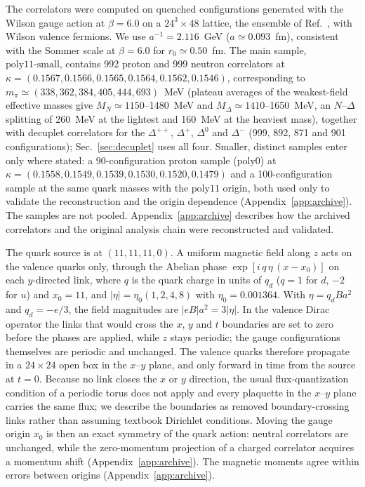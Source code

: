 \documentclass[aps,prd,reprint,twocolumn,superscriptaddress,nofootinbib,longbibliography]{revtex4-2}
\begin{document}
The correlators were computed on quenched configurations generated with the Wilson gauge action at $\beta=6.0$ on a $24^3\times48$ lattice, the ensemble of Ref.~\cite{AlexandruLee2010}, with Wilson valence fermions. We use $a^{-1}=2.116$~GeV ($a\simeq0.093$~fm), consistent with the Sommer scale at $\beta=6.0$ \cite{NeccoSommer2002} for $r_0\simeq0.50$~fm. The main sample, $\mathrm{poly11\mbox{-}small}$, contains 992 proton and 999 neutron correlators at $\kappa=(0.1567,\allowbreak 0.1566,\allowbreak 0.1565,\allowbreak 0.1564,\allowbreak 0.1562,\allowbreak 0.1546)$, corresponding to $m_\pi\simeq(338,\allowbreak 362,\allowbreak 384,\allowbreak 405,\allowbreak 444,\allowbreak 693)$~MeV (plateau averages of the weakest-field effective masses give $M_N\simeq1150$--1480~MeV and $M_\Delta\simeq1410$--1650~MeV, an $N$--$\Delta$ splitting of 260~MeV at the lightest and 160~MeV at the heaviest mass), together with decuplet correlators for the $\Delta^{++}$, $\Delta^+$, $\Delta^0$ and $\Delta^-$ (999, 892, 871 and 901 configurations); Sec.~\ref{sec:decuplet} uses all four. Smaller, distinct samples enter only where stated: a 90-configuration proton sample ($\mathrm{poly0}$) at $\kappa=(0.1558,\allowbreak 0.1549,\allowbreak 0.1539,\allowbreak 0.1530,\allowbreak 0.1520,\allowbreak 0.1479)$ and a 100-configuration sample at the same quark masses with the $\mathrm{poly11}$ origin, both used only to validate the reconstruction and the origin dependence (Appendix~\ref{app:archive}). The samples are not pooled. Appendix~\ref{app:archive} describes how the archived correlators and the original analysis chain were reconstructed and validated.

The quark source is at $(11,11,11,0)$. A uniform magnetic field along $z$ acts on the valence quarks only, through the Abelian phase $\exp[i\,q\,\eta\,(x-x_0)]$ on each $y$-directed link, where $q$ is the quark charge in units of $q_d$ ($q=1$ for $d$, $-2$ for $u$) and $x_0=11$, and $|\eta|=\eta_0(1,2,4,8)$ with $\eta_0=0.001364$. With $\eta=q_dBa^2$ and $q_d=-e/3$, the field magnitudes are $|eB|a^2=3|\eta|$. In the valence Dirac operator the links that would cross the $x$, $y$ and $t$ boundaries are set to zero before the phases are applied, while $z$ stays periodic; the gauge configurations themselves are periodic and unchanged. The valence quarks therefore propagate in a $24\times24$ open box in the $x$--$y$ plane, and only forward in time from the source at $t=0$. Because no link closes the $x$ or $y$ direction, the usual flux-quantization condition of a periodic torus does not apply and every plaquette in the $x$--$y$ plane carries the same flux; we describe the boundaries as removed boundary-crossing links rather than assuming textbook Dirichlet conditions. Moving the gauge origin $x_0$ is then an exact symmetry of the quark action: neutral correlators are unchanged, while the zero-momentum projection of a charged correlator acquires a momentum shift (Appendix~\ref{app:archive}). The magnetic moments agree within errors between origins (Appendix~\ref{app:archive}).
\end{document}
